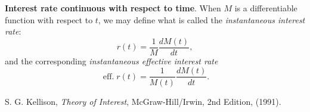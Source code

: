 \documentclass[12pt]{article}
\begin{document}
\textbf{Interest rate continuous with respect to time}.  When $M$ is a differentiable function with respect to $t$, we may define what is called the \emph{instantaneous interest rate}: $$r(t)=\frac{1}{M}\frac{dM(t)}{dt},$$ and the corresponding \emph{instantaneous effective interest rate} $$\operatorname{eff.}r(t)=\frac{1}{M(t)}\frac{dM(t)}{dt}.$$

\begin{thebibliography}{8}
 S. G. Kellison, {\em Theory of Interest}, McGraw-Hill/Irwin, 2nd Edition, (1991).
\end{thebibliography}
\end{document}
